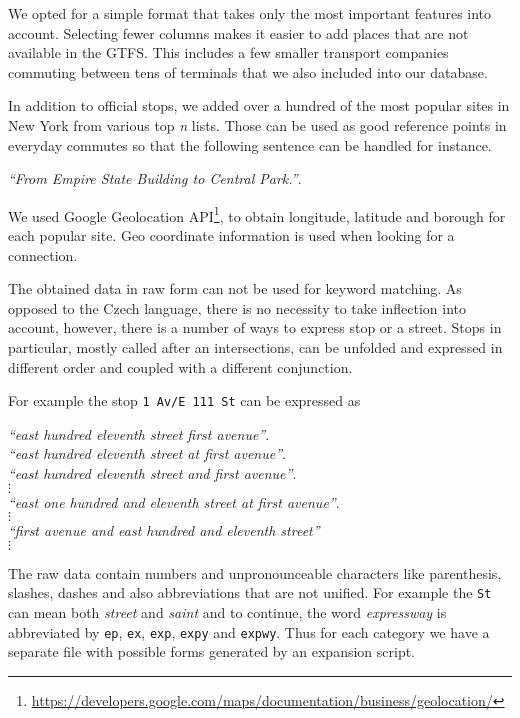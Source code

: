 We opted for a simple format that takes only the most important features into account.
Selecting fewer columns makes it easier to add places that are not available in the \ac{GTFS}.
This includes a few smaller transport companies commuting between tens of terminals that we also included into our database.

In addition to official stops, we added over a hundred of the most popular sites in New York from various top \textit{n} lists.
Those can be used as good reference points in everyday commutes so that the following sentence can be handled for instance.

\begin{flushleft}
\textit{``From Empire State Building to Central Park.''}.
\end{flushleft}

\noindent We used Google Geolocation \ac{API}\footnote{\url{https://developers.google.com/maps/documentation/business/geolocation/}}, to obtain longitude, latitude and borough for each popular site. Geo coordinate information is used when looking for a connection.

The obtained data in raw form can not be used for keyword matching. As opposed to the Czech language, there is no necessity to take inflection into account, however, there is a number of ways to express stop or a street.
Stops in particular, mostly called after an intersections, can be unfolded and expressed in different order and coupled with a different conjunction.

For example the stop \texttt{1 Av/E 111 St} can be expressed as
\begin{flushleft}
\textit{``east hundred eleventh street first avenue''}. \\
\textit{``east hundred eleventh street at first avenue''}. \\
\textit{``east hundred eleventh street and first avenue''}. \\
\hspace{8em} $\vdots$ \\
\textit{``east one hundred and eleventh street at first avenue''}. \\
\hspace{8em} $\vdots$ \\
\textit{``first avenue and east hundred and eleventh street''} \\
\hspace{8em} $\vdots$
\end{flushleft}

The raw data contain numbers and unpronounceable characters like parenthesis, slashes, dashes and also abbreviations that are not unified.
For example the \texttt{St} can mean both \textit{street} and \textit{saint} and to continue, the word \textit{expressway} is abbreviated by \texttt{ep}, \texttt{ex}, \texttt{exp}, \texttt{expy} and \texttt{expwy}.
Thus for each category we have a separate file with possible forms generated by an expansion script.

